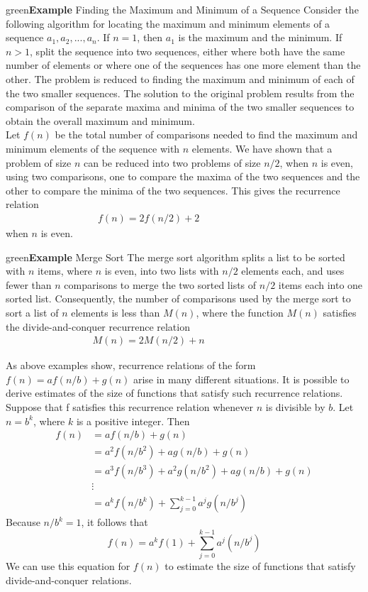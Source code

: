\documentclass[11pt]{article}
\newenvironment{example}[1][\unskip]{\begin{mybox}{green}{\textbf{Example} {#1}}}{\end{mybox}}
\begin{document}
\newpage
\begin{example}[Finding the Maximum and Minimum of a Sequence]
Consider the following algorithm for locating the maximum and minimum elements of a sequence $a_1, a_2, ..., a_n$. If $n = 1$, then $a_1$ is the maximum and the minimum. If $n > 1$, split the sequence into two sequences, either where both have the same number of elements or where one of the sequences has one more element than the other. The problem is reduced to finding the maximum and minimum of each of the two smaller sequences. The solution to the original problem results from the comparison of the separate maxima and minima of the two smaller sequences to obtain the overall maximum and minimum.\\

Let $f(n)$ be the total number of comparisons needed to find the maximum and minimum elements of the sequence with $n$ elements. We have shown that a problem of size $n$ can be reduced into two problems of size $n/2$, when $n$ is even, using two comparisons, one to compare the maxima of the two sequences and the other to compare the minima of the two sequences. This gives the recurrence relation
\begin{align*}
    f(n) = 2f(n/2) + 2 & & & & & & & & &
\end{align*}
when $n$ is even.
\end{example}

\begin{example}[Merge Sort]
The merge sort algorithm splits a list to be sorted with $n$ items, where $n$ is even, into two lists with $n/2$ elements each, and uses fewer than $n$ comparisons to merge the two sorted lists of $n/2$ items each into one sorted list. Consequently, the number of comparisons used by the merge sort to sort a list of $n$ elements is less than $M(n)$, where the function $M(n)$ satisfies the divide-and-conquer recurrence relation
\begin{align*}
    M(n) = 2M(n/2) + n & & & & & & & & &
\end{align*}
\end{example}

As above examples show, recurrence relations of the form $f(n) = af(n/b) + g(n)$ arise in many different situations. It is possible to derive estimates of the size of functions that satisfy such recurrence relations. Suppose that f satisfies this recurrence relation whenever $n$ is divisible by $b$. Let $n = b^k$, where $k$ is a positive integer. Then
\begin{align*}
    f(n) &= af(n/b) + g(n)\\
    &= a^2f(n/b^2) + ag(n/b) + g(n)\\
    &= a^3f(n/b^3) + a^2g(n/b^2) + ag(n/b) + g(n)\\
    &\vdots\\
    &= a^kf(n/b^k) + \sum_{j=0}^{k-1}a^jg(n/b^j)
\end{align*}
Because $n/b^k = 1$, it follows that
\begin{equation*}
    f(n) = a^kf(1) + \sum_{j=0}^{k-1} a^j(n/b^j)
\end{equation*}
We can use this equation for $f(n)$ to estimate the size of functions that satisfy divide-and-conquer relations.
\end{document}
